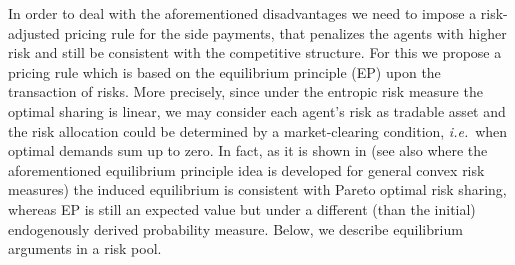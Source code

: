 \documentclass[fleqn,mnsc,nonblindrev]{informs4}
\begin{document}
   {In order to deal with the aforementioned disadvantages we need to impose a risk-adjusted pricing rule for the side payments, that penalizes the agents with higher risk and still be consistent with the competitive structure. For this we propose a pricing rule which is based on the equilibrium principle (EP) upon the transaction of risks. More precisely, since under the entropic risk measure the optimal sharing is linear, we may consider each agent's risk as tradable asset and the risk allocation could be determined by a market-clearing condition, {\it i.e.}~when optimal demands sum up to zero. In fact, as it is shown in \cite{anthropelos2010agent} (see also \cite{anthropelos2010agent2} where the aforementioned equilibrium principle idea is developed for general convex risk measures) the induced equilibrium is consistent with Pareto optimal risk sharing, whereas EP is still an expected value but under a different (than the initial) endogenously derived probability measure. Below, we describe equilibrium arguments in a risk pool.}
\end{document}
